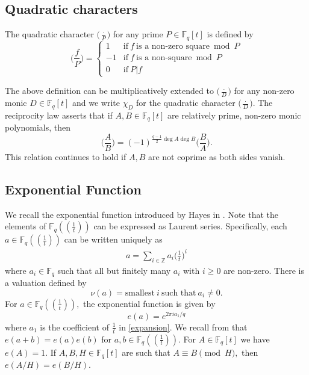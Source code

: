 \documentclass[12pt,reqno]{amsart}
\newcommand{\Z}{\mathbb{Z}}
\newcommand{\F}{\mathbb{F}}
\newcommand{\BF}{\mathbb{F}}
\begin{document}
\subsection{Quadratic characters}
The quadratic character $\Big ( \frac{\cdot}{P}\Big)$ for any prime $P \in \BF_{q}[t]$ is defined by
\[
\Big (\frac{f}{P} \Big )= 
\begin{cases} 
1 & \text{if}\ f\ \text{is a non-zero square} \bmod P \\
-1 & \text{if}\ f\ \text{is a non-square} \bmod P  \\
0 & \text{if}\ P | f  
\end{cases}
\]

The above definition can be multiplicatively extended to $\Big (\frac{\cdot}{D}\Big)$ for any non-zero monic $D \in \BF_{q}[t]$ and we write $\chi_{D}$ for the quadratic character $\Big ( \frac{\cdot}{D} \Big)$. The reciprocity law asserts that if $A, B \in \BF_{q}[t]$ are relatively prime, non-zero monic polynomials, then 
$$
\Big ( \frac{A}{B} \Big ) = (-1)^{\frac{q-1}{2}\deg A \deg B} \Big ( \frac{B}{A} \Big ). 
$$
This relation continues to hold if $A,B$ are not coprime as both sides vanish. 

\subsection{Exponential Function} We recall the exponential function introduced by Hayes in \cite{Hayes1966}. Note that the elements of $\BF_q((\frac{1}{t}))$ can be expressed as Laurent series. Specifically, each $a \in \BF_{q}((\frac{1}{t}))$ can be written uniquely as
\begin{align}\label{expansion}
a = \sum\limits_{i \in \Z} a_i \Big (\frac{1}{t}\Big)^i
\end{align}
where $a_i \in \BF_q$ such that all but finitely many $a_i$ with $i \geq 0$ are non-zero. There is a valuation defined by
$$
\nu(a) = \text{smallest}\ i \ \text{such that}\ a_i \neq 0.
$$
For $a \in \BF_{q}((\frac{1}{t})),$ the exponential function is given by
$$
e(a)= e^{2\pi i a_1/q}
$$
where $a_1$ is the coefficient of $\frac{1}{t}$ in \eqref{expansion}. We recall from \cite{Hayes1966} that $e(a+b)=e(a)e(b)$ for $a,b \in \BF_{q}((\frac{1}{t})).$ For $A \in \F_q[t]$ we have $e(A)=1.$ If $A,B,H \in \BF_q[t]$ are such that $A \equiv B \pmod H,$ then $e(A/H)= e(B/H).$ 
\end{document}
